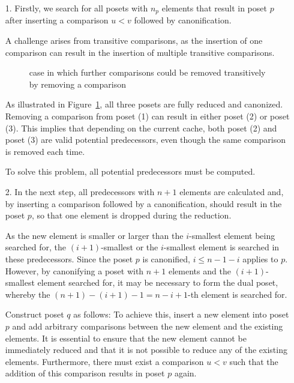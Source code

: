 \documentclass[10pt,journal,compsoc]{IEEEtran}
\begin{document}
\begin{itemize}
  \item[1.]
    Firstly, we search for all posets with $n_p$ elements that result in poset $p$ after inserting a comparison $u < v$ followed by canonification.

    A challenge arises from transitive comparisons, as the insertion of one comparison can result in the insertion of multiple transitive comparisons.

    \begin{figure}[!b]
      \centering
      
      \caption{case in which further comparisons could be removed transitively by removing a comparison}
      \label{fig:backward_problematic}
    \end{figure}

    As illustrated in Figure~\ref{fig:backward_problematic}, all three posets are fully reduced and canonized.
    Removing a comparison from poset (1) can result in either poset (2) or poset (3).
    This implies that depending on the current cache, both poset (2) and poset (3) are valid potential predecessors, even though the same comparison is removed each time.

    To solve this problem, all potential predecessors must be computed.

  \item[2.]
    In the next step, all predecessors with $n + 1$ elements are calculated and, by inserting a comparison followed by a canonification, should result in the poset $p$, so that one element is dropped during the reduction.

    As the new element is smaller or larger than the $i$-smallest element being searched for, the $(i + 1)$-smallest or the $i$-smallest element is searched in these predecessors. Since the poset $p$ is canonified, $i \leq n - 1 - i$ applies to $p$. However, by canonifying a poset with $n + 1$ elements and the $(i + 1)$-smallest element searched for, it may be necessary to form the dual poset, whereby the $(n + 1) - (i + 1) - 1 = n - i + 1$-th element is searched for.

    Construct poset $q$ as follows:
    To achieve this, insert a new element into poset $p$ and add arbitrary comparisons between the new element and the existing elements.
    It is essential to ensure that the new element cannot be immediately reduced and that it is not possible to reduce any of the existing elements.
    Furthermore, there must exist a comparison $u < v$ such that the addition of this comparison results in poset $p$ again.


\end{itemize}
\end{document}
